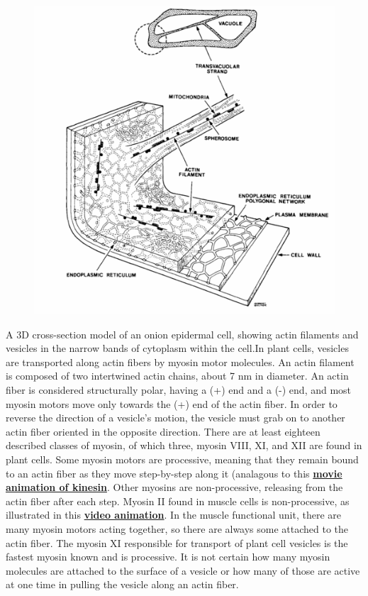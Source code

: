 \documentclass{../lab}
\begin{document}
\begin{figure}[h]
    \centering
    \href{http://experimentationlab.berkeley.edu/sites/default/files/images/500px-BMC_OnionStucture.gif}{\includegraphics[width=0.5\linewidth]{images/500px-BMC_OnionStucture.png}}
    \caption{}
    \label{fig:500px-BMC_OnionStucture}
\end{figure}


A 3D cross-section model of an onion epidermal cell, showing actin filaments and vesicles in the narrow bands of cytoplasm within the cell.In plant cells, vesicles are transported along actin fibers by myosin motor molecules. An actin filament is composed of two intertwined actin chains, about 7 nm in diameter. An actin fiber is considered structurally polar, having a (+) end and a (-) end, and most myosin motors move only towards the (+) end of the actin fiber. In order to reverse the direction of a vesicle's motion, the vesicle must grab on to another actin fiber oriented in the opposite direction. There are at least eighteen described classes of myosin, of which three, myosin VIII, XI, and XII are found in plant cells. Some myosin motors are processive, meaning that they remain bound to an actin fiber as they move step-by-step along it (analagous to this \href{http://valelab.ucsf.edu/images/movies/mov-procmotconvkinrev5.mov}{\textbf{movie animation of kinesin}}. Other myosins are non-processive, releasing from the actin fiber after each step. Myosin II found in muscle cells is non-processive, as illustrated in this \href{http://www.banyantree.org/jsale/actinmyosin/index.html}{\textbf{video animation}}. In the muscle functional unit, there are many myosin motors acting together, so there are always some attached to the actin fiber. The myosin XI responsible for transport of plant cell vesicles is the fastest myosin known and is processive. It is not certain how many myosin molecules are attached to the surface of a vesicle or how many of those are active at one time in pulling the vesicle along an actin fiber.
\end{document}
